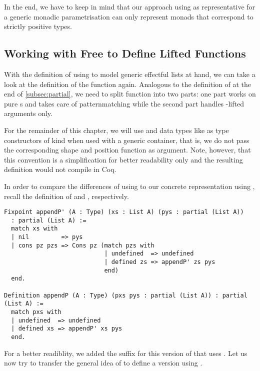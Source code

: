 In the end, we have to keep in mind that our approach using  as representative for a generic monadic parametrisation can only represent monads that correspond to strictly positive types.

\subsection{Working with Free to Define Lifted Functions}
\label{subsec:liftedFunctions}

With the definition of  using  to model generic effectful lists at hand, we can take a look at the definition of the function  again.
Analogous to the definition of  at the end of \autoref{subsec:partial}, we need to split function into two parts: one part works on pure s and takes care of patternmatching while the second part handles -lifted arguments only.

For the remainder of this chapter, we will use  and data types like  as type constructors of kind  when used with a generic container, that is, we do not pass the corresponding shape and position function as argument.
Note, however, that this convention is a simplification for better readability only and the resulting definition would not compile in Coq.

In order to compare the differences of using  to our concrete representation using , recall the definition of  and , respectively.

\begin{verbatim}
Fixpoint appendP' (A : Type) (xs : List A) (pys : partial (List A))
  : partial (List A) :=
  match xs with
  | nil         => pys
  | cons pz pzs => Cons pz (match pzs with
                            | undefined  => undefined
                            | defined zs => appendP' zs pys
                            end)
  end.

Definition appendP (A : Type) (pxs pys : partial (List A)) : partial (List A) :=
  match pxs with
  | undefined  => undefined
  | defined xs => appendP' xs pys
  end.
\end{verbatim}

For a better readiblity, we added the suffix  for this version of  that uses .
Let us now try to transfer the general idea of  to define a version using .

